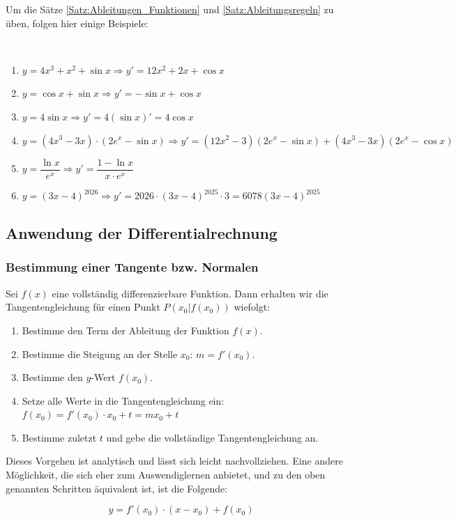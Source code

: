 \documentclass[ngerman, 12pt]{nssheetxea}
\begin{document}
Um die Sätze \ref{Satz:Ableitungen_Funktionen} und \ref{Satz:Ableitungsregeln} zu üben, folgen hier einige Beispiele:

\begin{example} \
\begin{enumerate}
\item $y=4x^3+x^2+ \sin x \Rightarrow y' = 12x^2+2x+\cos x$
\item $y=\cos x + \sin x \Rightarrow y' = - \sin x + \cos x$
\item $y=4 \sin x \Rightarrow y'=4 (\sin x)'=4\cos x$
\item $y=(4x^3-3x)\cdot (2e^x-\sin x) \Rightarrow y'=(12x^2-3)(2e^x-\sin x)+(4x^3-3x)(2e^x-\cos x)$
\item $y=\dfrac{\ln x}{e^x} \Rightarrow y'=\dfrac{1-\ln x}{x\cdot e^x}$
\item $y=(3x-4)^{2026} \Rightarrow y'=2026 \cdot (3x-4)^{2025} \cdot 3 = 6078 (3x-4)^{2025}$
\end{enumerate}
\end{example}

\newpage

\subsection{Anwendung der Differentialrechnung}
\subsubsection{Bestimmung einer Tangente bzw. Normalen}
\begin{theorem}
Sei $f(x)$ eine vollständig differenzierbare Funktion. Dann erhalten wir die Tangentengleichung für einen Punkt $P(x_0|f(x_0))$ wiefolgt:

\begin{enumerate}
\item Bestimme den Term der Ableitung der Funktion $f(x)$.
\item Bestimme die Steigung an der Stelle $x_0$: $m=f'(x_0)$.
\item Bestimme den $y$-Wert $f(x_0)$. 
\item Setze alle Werte in die Tangentengleichung ein: $f(x_0)=f'(x_0) \cdot x_0 +t = m x_0 +t$
\item Bestimme zuletzt $t$ und gebe die vollständige Tangentengleichung an.
\end{enumerate}
Dieses Vorgehen ist analytisch und lässt sich leicht nachvollziehen. Eine andere Möglichkeit, die sich eher zum Auswendiglernen anbietet, und zu den oben genannten Schritten äquivalent ist, ist die Folgende: \par
\[ y=f'(x_0) \cdot (x-x_0)+f(x_0) \]
\label{Satz:Tangente}
\end{theorem}
\end{document}
